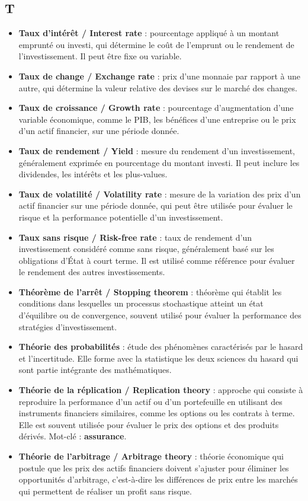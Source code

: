 \documentclass[a4paper,10pt]{article}
\begin{document}
\begin{multicols}{2}
\section*{T}
\begin{itemize}
  \item \textbf{Taux d’intérêt / Interest rate} : pourcentage appliqué à un montant emprunté ou investi, qui détermine le coût de l’emprunt ou le rendement de l’investissement. Il peut être fixe ou variable.
  \item \textbf{Taux de change / Exchange rate} : prix d’une monnaie par rapport à une autre, qui détermine la valeur relative des devises sur le marché des changes.
  \item \textbf{Taux de croissance / Growth rate} : pourcentage d’augmentation d’une variable économique, comme le PIB, les bénéfices d’une entreprise ou le prix d’un actif financier, sur une période donnée.
  \item \textbf{Taux de rendement / Yield} : mesure du rendement d’un investissement, généralement exprimée en pourcentage du montant investi. Il peut inclure les dividendes, les intérêts et les plus-values.
  \item \textbf{Taux de volatilité / Volatility rate} : mesure de la variation des prix d’un actif financier sur une période donnée, qui peut être utilisée pour évaluer le risque et la performance potentielle d’un investissement.
  \item \textbf{Taux sans risque / Risk-free rate} : taux de rendement d’un investissement considéré comme sans risque, généralement basé sur les obligations d’État à court terme. Il est utilisé comme référence pour évaluer le rendement des autres investissements.
  \item \textbf{Théorème de l'arrêt / Stopping theorem} : théorème qui établit les conditions dans lesquelles un processus stochastique atteint un état d’équilibre ou de convergence, souvent utilisé  pour évaluer la performance des stratégies d’investissement.
  \item \textbf{Théorie des probabilités} : étude des phénomènes caractérisés par le hasard et l'incertitude. Elle forme avec la statistique les deux sciences du hasard qui sont partie intégrante des mathématiques.
  \item \textbf{Théorie de la réplication / Replication theory} : approche qui consiste à reproduire la performance d’un actif ou d’un portefeuille en utilisant des instruments financiers similaires, comme les options ou les contrats à terme. Elle est souvent utilisée pour évaluer le prix des options et des produits dérivés. Mot-clé : \textbf{assurance}.
  \item \textbf{Théorie de l’arbitrage / Arbitrage theory} : théorie économique qui postule que les prix des actifs financiers doivent s’ajuster pour éliminer les opportunités d’arbitrage, c’est-à-dire les différences de prix entre les marchés qui permettent de réaliser un profit sans risque.
\end{itemize}


\end{multicols}
\end{document}
